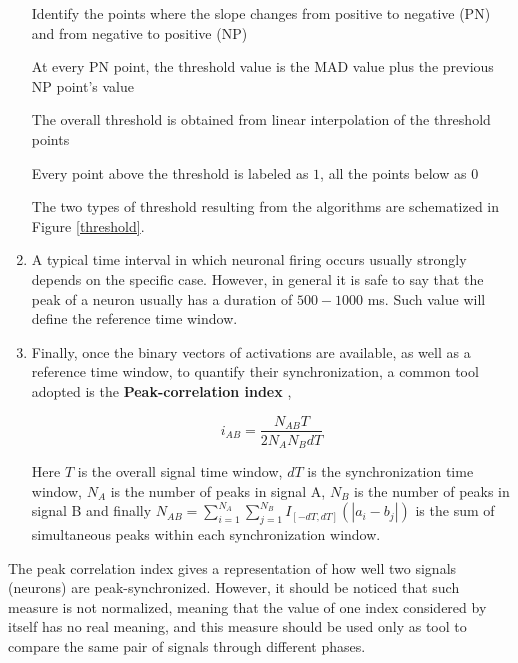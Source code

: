 \documentclass[12pt, a4paper]{report}
\begin{document}
\begin{enumerate}
\begin{algorithm}
\begin{algorithmic}[1]
			\State Identify the points where the slope changes from positive to negative (PN) and from negative to positive (NP)
			
			
			\State At every PN point, the threshold value is the MAD value plus the previous NP point's value
			
			\State The overall threshold is obtained from linear interpolation of the threshold points
			
			\State Every point above the threshold is labeled as $1$, all the points below as $0$
		\end{algorithmic}
	\end{algorithm}
	
		The two types of threshold resulting from the algorithms are schematized in Figure \ref{threshold}.
	
	
	\item A typical time interval in which neuronal firing occurs usually strongly depends on the specific case. However, in general it is safe to say that the peak of a neuron usually has a duration of $500-1000$ ms. Such value will define the reference time window. 
	
	\item Finally, once the binary vectors of activations are available, as well as a reference time window, to quantify their synchronization, a common tool adopted is the \textbf{Peak-correlation index} \cite{18},%
	
	\begin{equation}
		i_{AB} = \frac{N_{AB} T}{2 N_A N_B dT} \label{peak index}
	\end{equation}
	 
	Here $T $ is the overall signal time window, $dT$ is the synchronization time window, $N_A$ is the number of peaks in signal A, $N_B $ is the number of peaks in signal B and finally $N_{AB} = \sum_{i=1}^{N_A} \sum_{j=1}^{N_B} I_{[-dT,dT]}(|a_i - b_j|) $ is the sum of simultaneous peaks within each synchronization window.
	
\end{enumerate}

The peak correlation index gives a representation of how well two signals (neurons) are peak-synchronized. However, it should be noticed that such measure is not normalized, meaning that the value of one index considered by itself has no real meaning, and this measure should be used only as tool to compare the same pair of signals through different phases.
\end{document}
